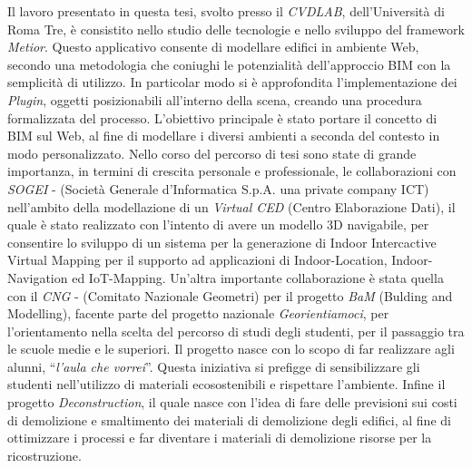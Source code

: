 Il lavoro presentato in questa tesi, svolto presso il \emph{CVDLAB},
dell'Università di Roma Tre, è consistito nello studio delle tecnologie e nello sviluppo del
framework \emph{Metior}.
Questo applicativo consente di modellare edifici in ambiente Web, secondo una metodologia che coniughi le potenzialità
dell’approccio BIM con la semplicità di utilizzo.
In particolar modo si è approfondita l'implementazione dei \emph{Plugin}, oggetti posizionabili all'interno della scena, creando
una procedura formalizzata del processo.
L'obiettivo principale è stato portare il concetto di BIM sul Web, al fine di modellare i diversi ambienti a seconda del
contesto in modo personalizzato.
Nello corso del percorso di tesi sono state di grande importanza, in termini di crescita personale e professionale,
le collaborazioni con \emph{SOGEI} - (Società Generale d'Informatica S.p.A. una private company ICT)
nell'ambito della modellazione di un \emph{Virtual CED} (Centro Elaborazione Dati),
il quale \`e stato realizzato con l'intento di avere un modello 3D navigabile, per consentire lo sviluppo di un sistema per
la generazione di Indoor Intercactive Virtual Mapping per il supporto ad applicazioni di Indoor-Location, Indoor-Navigation
ed IoT-Mapping.
Un'altra importante collaborazione è stata quella con il \emph{CNG} - (Comitato Nazionale Geometri) per il progetto \emph{BaM}
(Bulding and Modelling),
facente parte del progetto nazionale \emph{Georientiamoci}, per l'orientamento nella scelta del percorso di studi degli studenti,
per il passaggio tra le scuole medie e le superiori.
Il progetto nasce con lo scopo di far realizzare agli alunni, ``\emph{l'aula che vorrei}''.
Questa iniziativa si prefigge di sensibilizzare gli studenti nell'utilizzo di
materiali ecosostenibili e rispettare l'ambiente.
Infine il progetto \emph{Deconstruction}, il quale nasce con l'idea di fare delle previsioni
sui costi di demolizione e smaltimento dei materiali di demolizione degli edifici, al fine di ottimizzare i processi e far
diventare i materiali di demolizione risorse per la ricostruzione.
